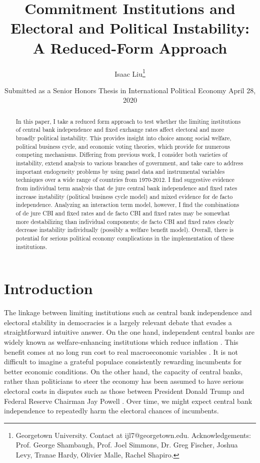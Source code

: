 \documentclass{article}
\title{Commitment Institutions and Electoral and Political Instability: A Reduced-Form Approach}
\author{Isaac Liu\thanks{Georgetown University. Contact at ijl7@georgetown.edu. Acknowledgements: Prof. George Shambaugh, Prof. Joel Simmons, Dr. Greg Fischer, Joshua Levy, Tranae Hardy, Olivier Malle, Rachel Shapiro.}}
\date{Submitted as a Senior Honors Thesis in International Political Economy April 28, 2020}
\begin{document}
	\maketitle

    \begin{abstract}
        In this paper, I take a reduced form approach to test whether the limiting institutions of central bank independence and fixed exchange rates affect electoral and more broadly political instability. This provides insight into choice among social welfare, political business cycle, and economic voting theories, which provide for numerous competing mechanisms. Differing from previous work, I consider both varieties of instability, extend analysis to various branches of government, and take care to address important endogeneity problems by using panel data and instrumental variables techniques over a wide range of countries from 1970-2012. I find suggestive evidence from individual term analysis that de jure central bank independence and fixed rates increase instability (political business cycle model) and mixed evidence for de facto independence. Analyzing an interaction term model, however, I find the combinations of de jure CBI and fixed rates and de facto CBI and fixed rates may be somewhat more destabilizing than individual components; de facto CBI and fixed rates clearly decrease instability individually (possibly a welfare benefit model). Overall, there is potential for serious political economy complications in the implementation of these institutions.
    \end{abstract}

    \clearpage
    \newpage

    \section*{Introduction}

    The linkage between limiting institutions such as central bank independence and electoral stability in democracies is a largely relevant debate that evades a straightforward intuitive answer. On the one hand, independent central banks are widely known as welfare-enhancing institutions which reduce inflation \citep{chicago_booth_initiative_on_global_markets_fed_2019}. This benefit comes at no long run cost to real macroeconomic variables \citep{alesina_political_1997}. It is not difficult to imagine a grateful populace consistently rewarding incumbents for better economic conditions. On the other hand, the capacity of central banks, rather than politicians to steer the economy has been assumed to have serious electoral costs in disputes such as those between President Donald Trump and Federal Reserve Chairman Jay Powell \citep{long_federal_2019}. Over time, we might expect central bank independence to repeatedly harm the electoral chances of incumbents.
\end{document}
